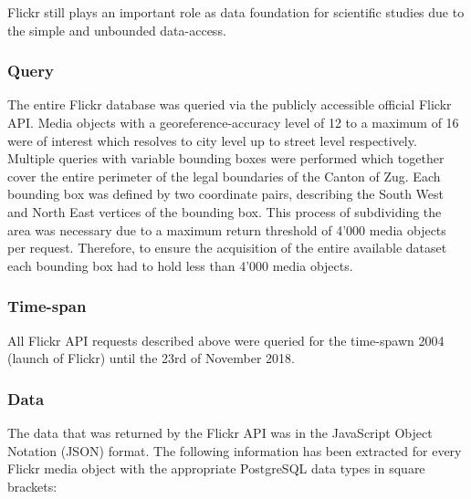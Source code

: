 Flickr still plays an important role as data foundation for scientific studies due to the simple and unbounded data-access. 
\subsubsection*{Query} \label{flickr_query}
The entire Flickr database was queried via the publicly accessible official Flickr API. Media objects with a georeference-accuracy level of 12 to a maximum of 16 were of interest which resolves to city level up to street level respectively. Multiple queries with variable bounding boxes were performed which together cover the entire perimeter of the legal boundaries of the Canton of Zug. Each bounding box was defined by two coordinate pairs, describing the South West and North East vertices of the bounding box. This process of subdividing the area was necessary due to a maximum return threshold of 4'000 media objects per request. Therefore, to ensure the acquisition of the entire available dataset each bounding box had to hold less than 4'000 media objects.

\subsubsection*{Time-span} \label{flickr_timespan}
All Flickr API requests described above were queried for the time-spawn 2004 (launch of Flickr) until the 23rd of November 2018.

\subsubsection*{Data} \label{flickr_data}
The data that was returned by the Flickr API was in the JavaScript Object Notation (JSON) format. The following information has been extracted for every Flickr media object with the appropriate PostgreSQL data types in square brackets:\\

